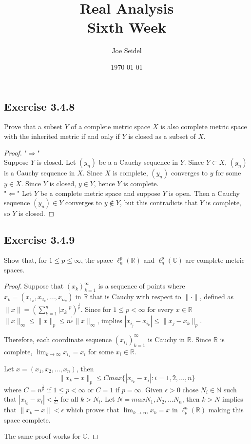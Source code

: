 \documentclass{tufte-book}
\title{Real Analysis\\Sixth Week }
\author{Joe Seidel}
\date{\today}
\theoremstyle{mytheoremstyle}
\theoremstyle{mylemstyle}
\theoremstyle{mydefstyle}
\begin{document}
\maketitle
{}
\newpage
{}

\subsection{Exercise 3.4.8}
Prove that a subset $Y$ of a complete metric space $X$ is also complete metric space with the inherited metric if and only if $Y$ is closed as a subset of $X$.

\begin{proof}"$\Rightarrow$"\\
Suppose $Y$ is closed. Let $(y_n)$ be a a Cauchy sequence in $Y$.  Since $Y \subset X$, $(y_n)$ is a Cauchy sequence in $X$.  Since $X$ is complete, $(y_n)$ converges to $y$ for some $y \in X$.  Since $Y$ is closed, $y \in Y$, hence $Y$ is complete.\\
"$\Leftarrow$" Let $Y$ be a complete metric space and suppose $Y$ is open.  Then a Cauchy sequence $(y_n) \in Y$ converges to $y \not\in Y$, but this contradicts that $Y$ is complete, so $Y$ is closed.

\end{proof}

\subsection{Exercise 3.4.9}
Show that, for $1 \leq p \leq \infty$, the space $\ell_n^p(\mathbb{R})$ and $\ell_n^p(\mathbb{C})$ are complete metric spaces.

\begin{proof}
Suppose that $(x_k)_{k=1}^\infty$ is a sequence of points where $x_k = (x_{1_{k}}, x_{2_{k}},...,x_{n_{k}})$ in $\mathbb{R}$ that is Cauchy with respect to $\|\cdot\|$, defined as $\|x\|=(\sum_{k=1}^n |x_k|^p)^\frac{1}{p}$.  Since for $1 \leq p < \infty$ for every $x \in \mathbb{R}$ $\|x\|_\infty \leq \|x\|_p \leq n^\frac{1}{p}\|x\|_\infty$, implies $|x_{i_j} - x_{i_k}| \leq \|x_j - x_k\|_p$.

Therefore, each coordinate sequence $(x_{i_k})_{k=1}^\infty$ is Cauchy in $\mathbb{R}$.  Since $\mathbb{R}$ is complete, $\lim_{k \to \infty}x_{i_k} = x_i$ for some $x_i \in \mathbb{R}$.

Let $x = (x_1, x_2,...,x_n)$, then
\[ \|x_k - x\|_p \leq C max\{|x_{i_k} - x_i|:i=1,2,...,n\} \]
where $C=n^\frac{1}{p}$ if $1 \leq p < \infty$ or $C=1$ if $p = \infty$.  Given $\epsilon >0$ chose $N_i \in \mathbb{N}$ such that $|x_{i_k} - x_i| < \frac{\epsilon}{C}$ for all $k > N_i$.  Let $N=max{N_1, N_2,...N_n}$, then $k>N$ implies that $\|x_k-x\| < \epsilon$ which proves that $\lim_{k \to \infty}x_k = x$ in $\ell_p^n(\mathbb{R})$ making this space complete.

The same proof works for $\mathbb{C}$.
\end{proof}
\end{document}
